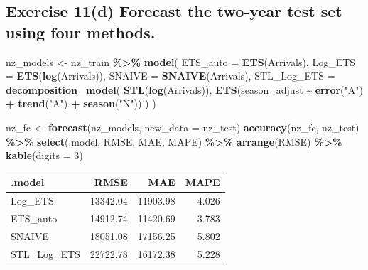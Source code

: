 \documentclass[
  11pt,
]{article}
\newenvironment{Shaded}{\begin{snugshade}}{\end{snugshade}}
\newcommand{\AttributeTok}[1]{\textcolor[rgb]{0.13,0.29,0.53}{#1}}
\newcommand{\DecValTok}[1]{\textcolor[rgb]{0.00,0.00,0.81}{#1}}
\newcommand{\FunctionTok}[1]{\textcolor[rgb]{0.13,0.29,0.53}{\textbf{#1}}}
\newcommand{\NormalTok}[1]{#1}
\newcommand{\OtherTok}[1]{\textcolor[rgb]{0.56,0.35,0.01}{#1}}
\newcommand{\SpecialCharTok}[1]{\textcolor[rgb]{0.81,0.36,0.00}{\textbf{#1}}}
\newcommand{\StringTok}[1]{\textcolor[rgb]{0.31,0.60,0.02}{#1}}
\newcounter{none} %
\begin{document}
\subsection{Exercise 11(d) Forecast the two-year test set using four
methods.}\label{exercise-11d-forecast-the-two-year-test-set-using-four-methods.}

\begin{Shaded}
\begin{Highlighting}[]
\NormalTok{nz\_models }\OtherTok{\textless{}{-}}\NormalTok{ nz\_train }\SpecialCharTok{\%\textgreater{}\%}
  \FunctionTok{model}\NormalTok{(}
    \AttributeTok{ETS\_auto =} \FunctionTok{ETS}\NormalTok{(Arrivals),}
    \AttributeTok{Log\_ETS =} \FunctionTok{ETS}\NormalTok{(}\FunctionTok{log}\NormalTok{(Arrivals)),}
    \AttributeTok{SNAIVE =} \FunctionTok{SNAIVE}\NormalTok{(Arrivals),}
    \AttributeTok{STL\_Log\_ETS =} \FunctionTok{decomposition\_model}\NormalTok{(}
      \FunctionTok{STL}\NormalTok{(}\FunctionTok{log}\NormalTok{(Arrivals)),}
      \FunctionTok{ETS}\NormalTok{(season\_adjust }\SpecialCharTok{\textasciitilde{}} \FunctionTok{error}\NormalTok{(}\StringTok{"A"}\NormalTok{) }\SpecialCharTok{+} \FunctionTok{trend}\NormalTok{(}\StringTok{"A"}\NormalTok{) }\SpecialCharTok{+} \FunctionTok{season}\NormalTok{(}\StringTok{"N"}\NormalTok{))}
\NormalTok{    )}
\NormalTok{  )}

\NormalTok{nz\_fc }\OtherTok{\textless{}{-}} \FunctionTok{forecast}\NormalTok{(nz\_models, }\AttributeTok{new\_data =}\NormalTok{ nz\_test)}
\FunctionTok{accuracy}\NormalTok{(nz\_fc, nz\_test) }\SpecialCharTok{\%\textgreater{}\%}
  \FunctionTok{select}\NormalTok{(.model, RMSE, MAE, MAPE) }\SpecialCharTok{\%\textgreater{}\%}
  \FunctionTok{arrange}\NormalTok{(RMSE) }\SpecialCharTok{\%\textgreater{}\%}
  \FunctionTok{kable}\NormalTok{(}\AttributeTok{digits =} \DecValTok{3}\NormalTok{)}
\end{Highlighting}
\end{Shaded}

{\def\LTcaptype{none} %
\begin{longtable}[]{@{}lrrr@{}}
\toprule\noalign{}
.model & RMSE & MAE & MAPE \\
\midrule\noalign{}
\endhead
\bottomrule\noalign{}
\endlastfoot
Log\_ETS & 13342.04 & 11903.98 & 4.026 \\
ETS\_auto & 14912.74 & 11420.69 & 3.783 \\
SNAIVE & 18051.08 & 17156.25 & 5.802 \\
STL\_Log\_ETS & 22722.78 & 16172.38 & 5.228 \\
\end{longtable}
}
\end{document}
